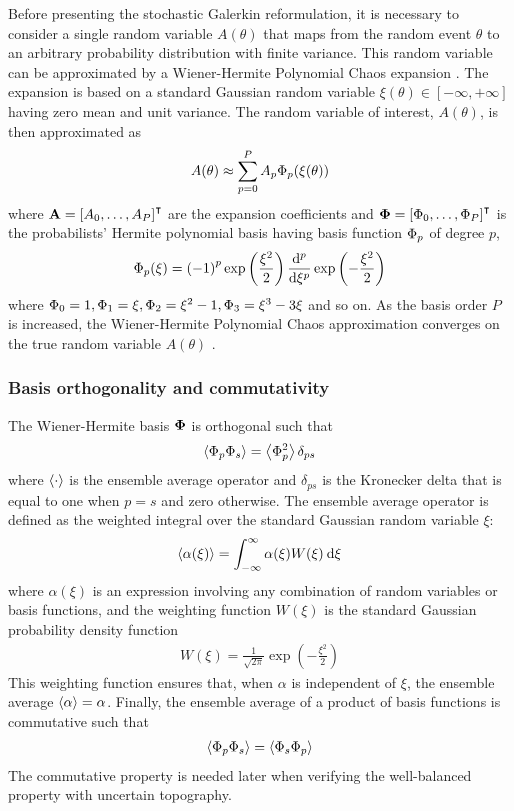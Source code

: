 Before presenting the stochastic Galerkin reformulation, it is necessary to consider a single random variable $A(\theta)$ that maps from the random event $\theta$ to an arbitrary probability distribution with finite variance.
This random variable can be approximated by a Wiener-Hermite Polynomial Chaos expansion \citep{xiu-karniadakis2002}.
The expansion is based on a standard Gaussian random variable $\xi(\theta) \in [-\infty, +\infty]$ having zero mean and unit variance.
The random variable of interest, $A(\theta)$, is then approximated as
\begin{align}
A(\theta) \approx \sum_{p=0}^P A_p \Phi_p(\xi(\theta))
\end{align}
where $\mathbf{A} = \left[ A_0, \ldots, A_P \right]^\intercal$ are the expansion coefficients and $\bm{\Phi} = \left[ \Phi_0, \ldots, \Phi_P \right]^\intercal$ is the probabilists' Hermite polynomial basis having basis function $\Phi_p$ of degree $p$,
\begin{align}
    \Phi_p(\xi) = \left( -1 \right)^p \exp \left(\frac{\xi^2}{2}\right)
    \frac{\mathrm{d}^p}{\mathrm{d} \xi^p} \exp \left(- \frac{\xi^2}{2} \right)
\end{align}
where $\Phi_0 = 1, \Phi_1 = \xi, \Phi_2 = \xi^2 - 1, \Phi_3 = \xi^3 - 3\xi$ and so on.
As the basis order $P$ is increased, the Wiener-Hermite Polynomial Chaos approximation converges on the true random variable $A(\theta)$ \citep{xiu-karniadakis2002}.

\subsubsection*{Basis orthogonality and commutativity}
The Wiener-Hermite basis $\bm{\Phi}$ is orthogonal such that
\begin{align}
	\left\langle \Phi_p \Phi_s \right\rangle = \left\langle \Phi_p^2 \right\rangle \delta_{ps}
\end{align}
where $\left\langle \cdot \right\rangle$ is the ensemble average operator and $\delta_{ps}$ is the Kronecker delta that is equal to one when $p = s$ and zero otherwise.
The ensemble average operator is defined as the weighted integral over the standard Gaussian random variable $\xi$:
\begin{align}
	\left\langle \alpha(\xi) \right\rangle = \int_{-\infty}^\infty \alpha(\xi) W(\xi) \:\mathrm{d} \xi \label{eqn:ensemble-average}
\end{align}
where $\alpha(\xi)$ is an expression involving any combination of random variables or basis functions, and the weighting function $W(\xi)$ is the standard Gaussian probability density function
\begin{align}
	W(\xi) = \frac{1}{\sqrt{2\pi}} \exp \left(-\frac{\xi^2}{2}\right)
\end{align}
This weighting function ensures that, when $\alpha$ is independent of $\xi$, the ensemble average $\left\langle \alpha \right\rangle = \alpha$.
Finally, the ensemble average of a product of basis functions is commutative such that
\begin{align}
    \left\langle \Phi_p \Phi_s \right\rangle = \left\langle \Phi_s \Phi_p \right\rangle
    \label{eqn:commutative}
\end{align}
The commutative property is needed later when verifying the well-balanced property with uncertain topography.

